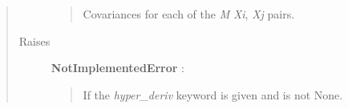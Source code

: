 \documentclass[letterpaper,10pt,english]{sphinxmanual}
\begin{document}
\begin{fulllineitems}
\begin{fulllineitems}
\begin{quote}
\begin{description}
\begin{quote}
Covariances for each of the \emph{M} \emph{Xi}, \emph{Xj} pairs.
\end{quote}

\item[{Raises}] \leavevmode
\textbf{NotImplementedError} :
\begin{quote}

If the \emph{hyper\_deriv} keyword is given and is not None.
\end{quote}

\end{description}\end{quote}

\end{fulllineitems}


\end{fulllineitems}

\end{document}
